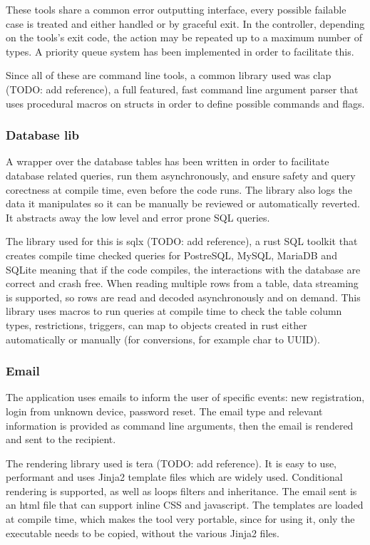     These tools share a common error outputting interface, every possible failable case is treated and either handled or by graceful exit. In the controller, depending on the tools's exit code, the action may be repeated up to a maximum number of types. A priority queue system has been implemented in order to facilitate this.

    Since all of these are command line tools, a common library used was clap (TODO: add reference), a full featured, fast command line argument parser that uses procedural macros on structs in order to define possible commands and flags.

    \subsubsection{Database lib}
    A wrapper over the database tables has been written in order to facilitate database related queries, run them asynchronously, and ensure safety and query corectness at compile time, even before the code runs. The library also logs the data it manipulates so it can be manually be reviewed or automatically reverted. It abstracts away the low level and error prone SQL queries.
    
    The library used for this is sqlx (TODO: add reference), a rust SQL toolkit that creates compile time checked queries for PostreSQL, MySQL, MariaDB and SQLite meaning that if the code compiles, the interactions with the database are correct and crash free. When reading multiple rows from a table, data streaming is supported, so rows are read and decoded asynchronously and on demand. This library uses macros to run queries at compile time to check the table column types, restrictions, triggers, can map to objects created in rust either automatically or manually (for conversions, for example char to UUID).
    
    \subsubsection{Email}
    The application uses emails to inform the user of specific events: new registration, login from unknown device, password reset. The email type and relevant information is provided as command line arguments, then the email is rendered and sent to the recipient.

    The rendering library used is tera (TODO: add reference). It is easy to use, performant and uses Jinja2 template files which are widely used. Conditional rendering is supported, as well as loops filters and inheritance. The email sent is an html file that can support inline CSS and javascript. The templates are loaded at compile time, which makes the tool very portable, since for using it, only the executable needs to be copied, without the various Jinja2 files.

